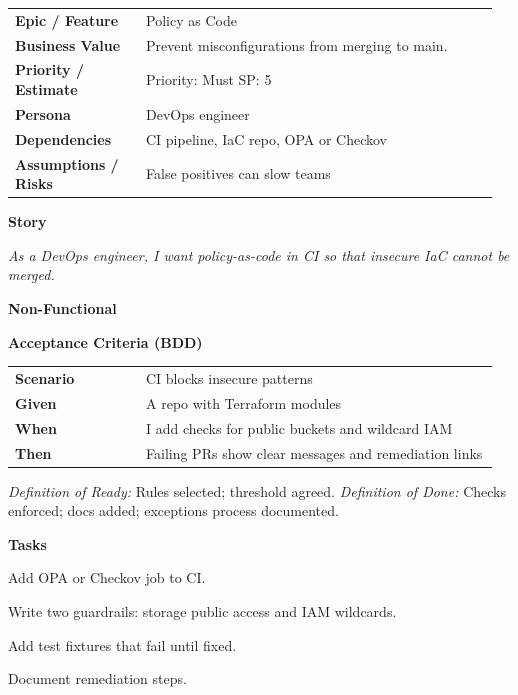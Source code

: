 \documentclass[11pt,letterpaper]{article}
\makeatletter
\newenvironment{kvtable}{%
  \par\noindent\begin{tabular}{@{}>{\raggedright\bfseries\arraybackslash}p{0.26\linewidth} >{\raggedright\arraybackslash}p{0.70\linewidth}@{}}
}{\end{tabular}\par}
\newenvironment{bdd}{%
  \par\noindent\begin{tabular}{@{}>{\raggedright\bfseries\arraybackslash}p{0.26\linewidth} >{\raggedright\arraybackslash}p{0.70\linewidth}@{}}
}{\end{tabular}\par}
\newcommand{\DoRDoD}[2]{%
  \vspace{0.35em}
  {\footnotesize\color{Muted}%
    \textit{Definition of Ready:} #1 \; \textbullet\;
    \textit{Definition of Done:} #2%
  }%
}
\newenvironment{storycard}[2]{%
  \begin{tcolorbox}[cloudcard, title={#1 --- #2}]%
}{\end{tcolorbox}}
\newcommand{\sectionlabel}[1]{\par\vspace{0.35em}\textbf{#1}\par}
\makeatother
\begin{document}
\begin{storycard}{CCS-8}{Ch. 8 — Cloud Security Risk Management}
\begin{kvtable}
Epic / Feature & Policy as Code\\
Business Value & Prevent misconfigurations from merging to main.\\
Priority / Estimate & Priority: Must \quad SP: 5\\
Persona & DevOps engineer\\
Dependencies & CI pipeline, IaC repo, OPA or Checkov\\
Assumptions / Risks & False positives can slow teams\\
\end{kvtable}
\sectionlabel{Story}
\textit{As a DevOps engineer, I want policy-as-code in CI so that insecure IaC cannot be merged.}
\sectionlabel{Non-Functional}\;
\sectionlabel{Acceptance Criteria (BDD)}
\begin{bdd}
Scenario & CI blocks insecure patterns\\
Given & A repo with Terraform modules\\
When & I add checks for public buckets and wildcard IAM\\
Then & Failing PRs show clear messages and remediation links\\
\end{bdd}
\DoRDoD{Rules selected; threshold agreed.}{Checks enforced; docs added; exceptions process documented.}
\sectionlabel{Tasks}
\begin{checklist}
\item Add OPA or Checkov job to CI.
\item Write two guardrails: storage public access and IAM wildcards.
\item Add test fixtures that fail until fixed.
\item Document remediation steps.
\end{checklist}
\end{storycard}
\end{document}
